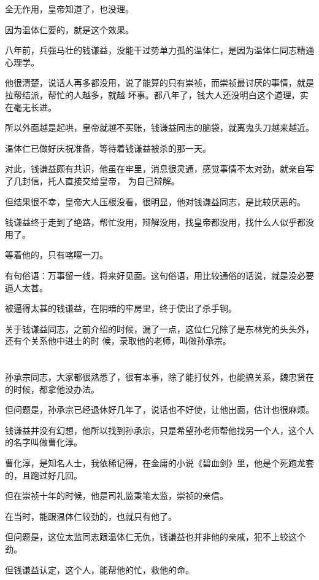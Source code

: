 \documentclass[11pt,a4paper,onecolumn]{article}
\begin{document}
全无作用，皇帝知道了，也没理。

因为温体仁要的，就是这个效果。

八年前，兵强马壮的钱谦益，没能干过势单力孤的温体仁，是因为温体仁同志精通心理学。

他很清楚，说话人再多都没用，说了能算的只有崇祯，而崇祯最讨厌的事情，就是拉帮结派，帮忙的人越多，就越
坏事。都八年了，钱大人还没明白这个道理，实在毫无长进。

所以外面越是起哄，皇帝就越不买账，钱谦益同志的脑袋，就离鬼头刀越来越近。

温体仁已做好庆祝准备，等待着钱谦益被杀的那一天。

对此，钱谦益颇有共识，他虽在牢里，消息很灵通，感觉事情不太对劲，就亲自写了几封信，托人直接交给皇帝，
为自己辩解。

但结果很不幸，皇帝大人压根没看，很明显，他对钱谦益同志，是比较厌恶的。

钱谦益终于走到了绝路，帮忙没用，辩解没用，找皇帝都没用，找什么人似乎都没用了。

等着他的，只有喀嚓一刀。

有句俗语：万事留一线，将来好见面。这句俗语，用比较通俗的话说，就是没必要逼人太甚。

被逼得太甚的钱谦益，在阴暗的牢房里，终于使出了杀手锏。

关于钱谦益同志，之前介绍的时候，漏了一点，这位仁兄除了是东林党的头头外，还有个关系\myrule 他中进士的时
候，录取他的老师，叫做孙承宗。

\section[\thesection]{}

孙承宗同志，大家都很熟悉了，很有本事，除了能打仗外，也能搞关系，魏忠贤在的时候，都拿他没办法。

但问题是，孙承宗已经退休好几年了，说话也不好使，让他出面，估计也很麻烦。

钱谦益并没有幻想，他所以找到孙承宗，只是希望孙老师帮他找另一个人，这个人的名字叫做曹化淳。

曹化淳，是知名人士，我依稀记得，在金庸的小说《碧血剑》里，他是个死跑龙套的，且跑过好几回。

但在崇祯十年的时候，他是司礼监秉笔太监，崇祯的亲信。

在当时，能跟温体仁较劲的，也就只有他了。

但问题是，这位太监同志跟温体仁无仇，钱谦益也并非他的亲戚，犯不上较这个劲。

但钱谦益认定，这个人，能帮他的忙，救他的命。
\end{document}
